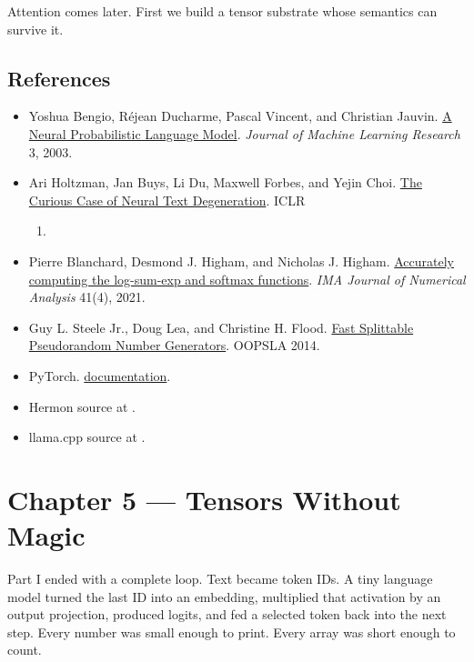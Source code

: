 \documentclass[
  10pt,
]{article}
\providecommand{\tightlist}{%
  \setlength{\itemsep}{0pt}\setlength{\parskip}{0pt}}
\begin{document}
Attention comes later. First we build a tensor substrate whose semantics
can survive it.

\subsection{References}\label{references-1}

\begin{itemize}
\tightlist
\item
  Yoshua Bengio, Réjean Ducharme, Pascal Vincent, and Christian Jauvin.
  \href{https://jmlr.org/papers/v3/bengio03a.html}{A Neural
  Probabilistic Language Model}. \emph{Journal of Machine Learning
  Research} 3, 2003.
\item
  Ari Holtzman, Jan Buys, Li Du, Maxwell Forbes, and Yejin Choi.
  \href{https://arxiv.org/abs/1904.09751}{The Curious Case of Neural
  Text Degeneration}. ICLR

  \begin{enumerate}
  \def\labelenumi{\arabic{enumi}.}
  \setcounter{enumi}{2019}
  \tightlist
  \item
  \end{enumerate}
\item
  Pierre Blanchard, Desmond J. Higham, and Nicholas J. Higham.
  \href{https://doi.org/10.1093/imanum/draa038}{Accurately computing the
  log-sum-exp and softmax functions}. \emph{IMA Journal of Numerical
  Analysis} 41(4), 2021.
\item
  Guy L. Steele Jr., Doug Lea, and Christine H. Flood.
  \href{https://doi.org/10.1145/2660193.2660195}{Fast Splittable
  Pseudorandom Number Generators}. OOPSLA 2014.
\item
  PyTorch.
  \href{https://docs.pytorch.org/docs/stable/generated/torch.nn.Softmax.html}{\texttt{}
  documentation}.
\item
  Hermon source at
  \texttt{}.
\item
  llama.cpp source at
  \texttt{}.
\end{itemize}

\clearpage

\section{Chapter 5 --- Tensors Without
Magic}\label{chapter-5-tensors-without-magic}

Part I ended with a complete loop. Text became token IDs. A tiny
language model turned the last ID into an embedding, multiplied that
activation by an output projection, produced logits, and fed a selected
token back into the next step. Every number was small enough to print.
Every array was short enough to count.
\end{document}
